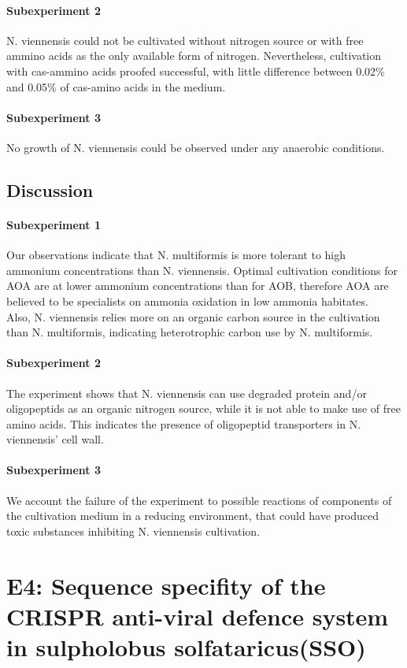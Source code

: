 \documentclass[a4paper,10pt]{article}
\begin{document}
\paragraph{Subexperiment 2}
N. viennensis could not be cultivated without nitrogen source or with free ammino acids as the only available form of nitrogen. Nevertheless, cultivation with cas-ammino acids proofed successful, with little difference between 0.02\% and 0.05\% of cas-amino acids in the medium.

\paragraph{Subexperiment 3}
No growth of N. viennensis could be observed under any anaerobic conditions.

\subsection{Discussion}
\paragraph{Subexperiment 1}
Our observations indicate that N. multiformis is more tolerant to high ammonium concentrations than N. viennensis. Optimal cultivation conditions for AOA are at lower ammonium concentrations than for AOB, therefore AOA are believed to be specialists on ammonia oxidation in low ammonia habitates.
\\ Also, N. viennensis relies more on an organic carbon source in the cultivation than N. multiformis, indicating heterotrophic carbon use by N. multiformis.
\paragraph{Subexperiment 2}
The experiment shows that N. viennensis can use degraded protein and/or oligopeptids as an organic nitrogen source, while it is not able to make use of free amino acids. This indicates the presence of oligopeptid transporters in N. viennensis' cell wall.
\paragraph{Subexperiment 3}
We account the failure of the experiment to possible reactions of components of the cultivation medium in a reducing environment, that could have produced toxic substances inhibiting N. viennensis cultivation.

\section{E4: Sequence specifity of the CRISPR anti-viral defence system in sulpholobus solfataricus(SSO)}
\end{document}
